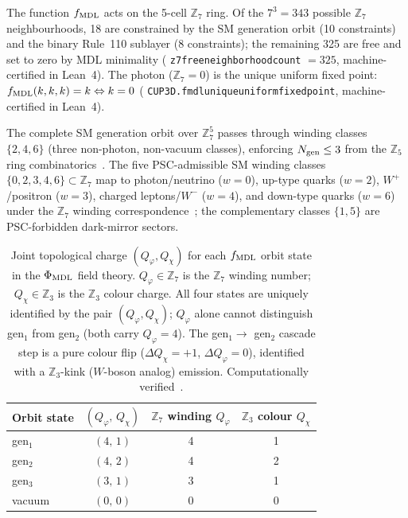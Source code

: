 \documentclass[11pt]{article}
\theoremstyle{remark}
\newcommand{\ZS}{\mathbb{Z}_7}
\newcommand{\Zfive}{\mathbb{Z}_5}
\newcommand{\Ngen}{N_{\rm gen}}
\newcommand{\fmdl}{f_{\rm MDL}}
\newcommand{\lean}[1]{%
  \penalty-100
  \begingroup\def\_{\textunderscore\allowbreak}\texttt{#1}\endgroup}
\begin{document}
The function $\fmdl$ acts on the 5-cell $\ZS$ ring.
Of the $7^3 = 343$ possible $\ZS$ neighbourhoods, 18 are constrained by the SM
generation orbit (10 constraints) and the binary Rule~110 sublayer (8 constraints);
the remaining 325 are free and set to zero by MDL minimality
(\lean{z7\_free\_neighborhood\_count} $= 325$, machine-certified in Lean~4).
The photon ($\ZS = 0$) is the unique uniform fixed point:
$\fmdl(k,k,k) = k \Leftrightarrow k = 0$
(\lean{CUP3D.fmdl\_unique\_uniform\_fixed\_point}, machine-certified in Lean~4).

The complete SM generation orbit over $\ZS^5$ passes through winding classes
$\{2,4,6\}$ (three non-photon, non-vacuum classes), enforcing $\Ngen \leq 3$
from the $\Zfive$ ring combinatorics~\cite{SpivackCompUniversality}.
The five PSC-admissible SM winding classes $\{0,2,3,4,6\} \subset \ZS$ map to
photon/neutrino ($w=0$), up-type quarks ($w=2$), $W^+$/positron ($w=3$),
charged leptons/$W^-$ ($w=4$), and down-type quarks ($w=6$) under the $\ZS$
winding correspondence~\cite{Spivack2026_SM_UGP}; the complementary classes
$\{1,5\}$ are PSC-forbidden dark-mirror sectors.

\begin{table}[h!]
\centering
\small
\caption{Joint topological charge $(Q_\varphi, Q_\chi)$ for each $f_{\rm MDL}$ orbit
state in the $\Phi_{\rm MDL}$ field theory.
$Q_\varphi \in \mathbb{Z}_7$ is the $\mathbb{Z}_7$ winding number;
$Q_\chi \in \mathbb{Z}_3$ is the $\mathbb{Z}_3$ colour charge.
All four states are uniquely identified by the pair $(Q_\varphi, Q_\chi)$;
$Q_\varphi$ alone cannot distinguish gen$_1$ from gen$_2$ (both carry $Q_\varphi = 4$).
The gen$_1 \to$ gen$_2$ cascade step is a pure colour flip ($\Delta Q_\chi = +1$, $\Delta Q_\varphi = 0$),
identified with a $\mathbb{Z}_3$-kink ($W$-boson analog) emission.
Computationally verified~\cite{SpivackGTEQCDStructure}.}
\label{tab:kink_qn}
\begin{tabular}{lccc}
\toprule
\textbf{Orbit state} & \textbf{$(Q_\varphi,\, Q_\chi)$} & \textbf{$\mathbb{Z}_7$ winding $Q_\varphi$} & \textbf{$\mathbb{Z}_3$ colour $Q_\chi$} \\
\midrule
gen$_1$ & $(4,\,1)$ & 4 & 1 \\
gen$_2$ & $(4,\,2)$ & 4 & 2 \\
gen$_3$ & $(3,\,1)$ & 3 & 1 \\
vacuum  & $(0,\,0)$ & 0 & 0 \\
\bottomrule
\end{tabular}
\end{table}
\end{document}
